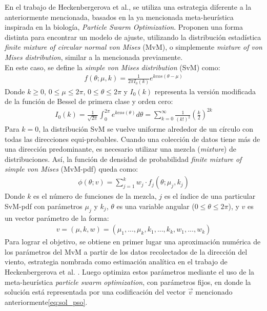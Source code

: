 En el trabajo de Heckenbergerova et al.\cite{Heckenbergerova15}, se utiliza una estrategia diferente a la anteriormente mencionada, basados en la ya mencionada meta-heurística inspirada en la biología, \emph{Particle Swarm Optimization}. Proponen una forma distinta para encontrar un modelo de ajuste, utilizando la distribución estadística \emph{finite mixture of circular normal von Mises} (MvM), o simplemente \emph{mixture of von Mises distribution}, similar a la mencionada previamente.\\ 
En este caso, se define la \emph{simple von Mises distribution} (SvM) como:
\begin{align}\label{eq:simpleVonMises}
    f(\theta; \mu, k) = \frac{1}{2{\pi}I_{0}(k)}e^{k cos(\theta - \mu)}
\end{align}    
Donde $k \geq 0$, $0 \leq \mu \leq 2\pi$, $0 \leq \theta \leq 2\pi$ y $I_0(k)$ representa la versión modificada de la función de Bessel de primera clase y orden cero:
\begin{align}
    I_0(k) = \frac{1}{\sqrt{2\pi}}\int_0^{2\pi} e^{k cos(\theta)} d\theta = \sum_{k=0}^{\infty} \frac{1}{(k!)^2}(\frac{k}{2})^{2k}
\end{align}    
Para $k=0$, la distribución SvM se vuelve uniforme alrededor de un círculo con todas las direcciones equi-probables. Cuando una colección de datos tiene más de una dirección predominante, es necesario utilizar una mezcla (\emph{mixture}) de distribuciones.
Así, la función de densidad de probabilidad \emph{finite mixture of simple von Mises} (MvM-pdf) queda como:
\begin{align}\label{eq:mixtureVonMises}
    \phi(\theta; v) = \sum_{j=1}^{k} w_j \cdot f_j(\theta; \mu_j, k_j)
\end{align}    
Donde $k$ es el número de funciones de la mezcla, $j$ es el índice de una particular SvM-pdf con parámetros $\mu_j$ y $k_j$, $\theta$ es una variable angular ($0 \leq \theta \leq 2\pi$), y $v$ es un vector parámetro de la forma:
 \begin{align}\label{eq:sol_pso}
    v = (\mu, k, w) = (\mu_1, ..., \mu_k,k_1,...,k_k,w_1,...,w_k)
\end{align}
Para lograr el objetivo, se obtiene en primer lugar una aproximación numérica de los parámetros del MvM a partir de los datos recolectados de la dirección del viento, estrategia nombrada como estimación analítica en el trabajo de Heckenbergerova et al. \cite{Heckenbergerova15}. Luego optimiza estos parámetros mediante el uso de la meta-heurística \emph{particle swarm optimization}, con parámetros fijos, en donde la solución está representada por una codificación del vector $\vec{v}$ mencionado anteriormente\ref{eq:sol_pso}.\\ 
